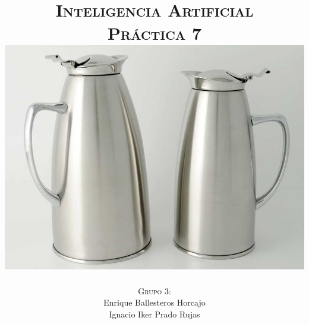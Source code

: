 \documentclass[11pt, a4paper, spanish, openright, twoside]{book}
\begin{document}
 
\title{\Huge{\textsc{Inteligencia Artificial}} \\
	\vspace{0.7cm}
	 \textsc{\Large{Práctica 7}} \\
	\vspace{1.5cm}
	\includegraphics[scale=0.45]{jarras}}
\author{\textsc{Grupo 3:}\\
	Enrique Ballesteros Horcajo\\
	Ignacio Iker Prado Rujas}
\date{\Today}
\maketitle

\newpage
\mbox{}
\thispagestyle{empty}						%
\newpage


\tableofcontents 							%

\newpage
\mbox{}
\thispagestyle{empty}						%
\newpage


\vspace{3cm}


\newpage
\end{document}
